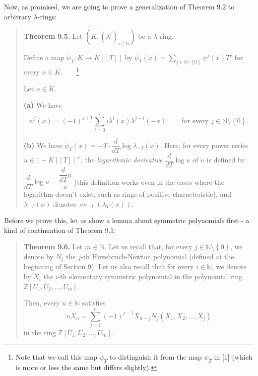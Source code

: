 \documentclass[numbers=enddot,12pt,final,onecolumn,notitlepage]{scrartcl}%
\begin{document}
Now, as promised, we are going to prove a generalization of Theorem 9.2 to
arbitrary $\lambda$-rings:

\begin{quote}
\textbf{Theorem 9.5.} Let $\left(  K,\left(  \lambda^{i}\right)
_{i\in\mathbb{N}}\right)  $ be a $\lambda$-ring.

Define a map $\widetilde{\psi}_{T}:K\rightarrow K\left[  \left[  T\right]
\right]  $ by $\widetilde{\psi}_{T}\left(  x\right)  =\sum\limits_{j\in
\mathbb{N}\setminus\left\{  0\right\}  }\psi^{j}\left(  x\right)  T^{j}$ for
every $x\in K$.\ \ \ \ \footnote{Note that we call this map $\widetilde{\psi
}_{T}$ to distinguish it from the map $\psi_{T}$ in [1] (which is more or less
the same but differs slightly).}

Let $x\in K$.

\textbf{(a)} We have%
\[
\psi^{j}\left(  x\right)  =\left(  -1\right)  ^{j+1}\sum_{i=0}^{j}i\lambda
^{i}\left(  x\right)  \lambda^{j-i}\left(  -x\right)
\ \ \ \ \ \ \ \ \ \ \text{for every }j\in\mathbb{N}\setminus\left\{
0\right\}  \text{.}%
\]


\textbf{(b)} We have $\widetilde{\psi}_{T}\left(  x\right)  =-T\cdot\dfrac
{d}{dT}\log\lambda_{-T}\left(  x\right)  $. Here, for every power series
$u\in1+K\left[  \left[  T\right]  \right]  ^{+}$, the \textit{logarithmic
derivative} $\dfrac{d}{dT}\log u$ of $u$ is defined by $\dfrac{d}{dT}\log
u=\dfrac{\dfrac{d}{dT}u}{u}$ (this definition works even in the cases where
the logarithm doesn't exist, such as rings of positive characteristic), and
$\lambda_{-T}\left(  x\right)  $ denotes $\operatorname*{ev}_{-T}\left(
\lambda_{T}\left(  x\right)  \right)  $.
\end{quote}

Before we prove this, let us show a lemma about symmetric polynomials first -
a kind of continuation of Theorem 9.1:

\begin{quote}
\textbf{Theorem 9.6.} Let $m\in\mathbb{N}$. Let us recall that, for every
$j\in\mathbb{N}\setminus\left\{  0\right\}  $, we denote by $N_{j}$ the $j$-th
Hirzebruch-Newton polynomial (defined at the beginning of Section 9). Let us
also recall that for every $i\in\mathbb{N}$, we denote by $X_{i}$ the $i$-th
elementary symmetric polynomial in the polynomial ring $\mathbb{Z}\left[
U_{1},U_{2},...,U_{m}\right]  $.

Then, every $n\in\mathbb{N}$ satisfies%
\[
nX_{n}=\sum_{j=1}^{n}\left(  -1\right)  ^{j-1}X_{n-j}N_{j}\left(  X_{1}%
,X_{2},...,X_{j}\right)
\]
in the ring $\mathbb{Z}\left[  U_{1},U_{2},...,U_{m}\right]  $.
\end{quote}
\end{document}
